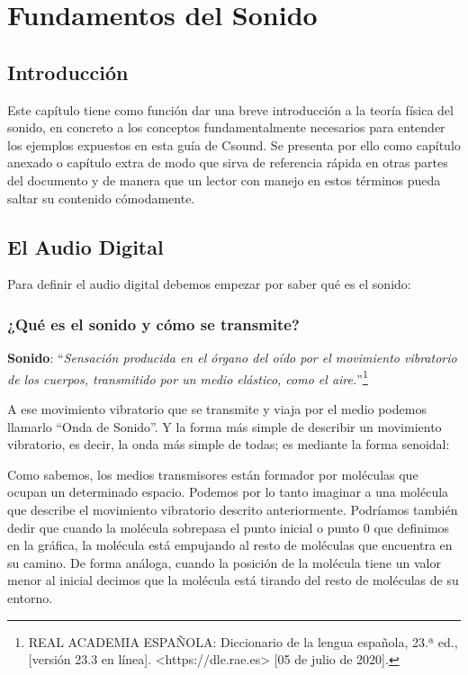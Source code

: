 
\chapter{Fundamentos del Sonido}

\section{Introducción}\label{sec:intro}
Este capítulo tiene como función dar una breve introducción a la teoría física del sonido, en concreto a los conceptos fundamentalmente necesarios para entender los ejemplos expuestos en esta guía de Csound.
Se presenta por ello como capítulo anexado o capítulo extra de modo que sirva de referencia rápida en otras partes del documento y de manera que un lector con manejo en estos términos pueda saltar su contenido cómodamente.


\section{El Audio Digital}\label{sec:DigAud} 
Para definir el audio digital debemos empezar por saber qué es el sonido:\bigskip

\subsection{¿Qué es el sonido y cómo se transmite?}

\textbf{Sonido}: ``\textsl{Sensación producida en el órgano del oído por el movimiento vibratorio de los cuerpos, transmitido por un medio elástico, como el aire.}''\footnote{REAL ACADEMIA ESPAÑOLA: Diccionario de la lengua española, 23.ª ed., [versión 23.3 en línea]. <https://dle.rae.es> [05 de julio de 2020].}\bigskip

A ese movimiento vibratorio que se transmite y viaja por el medio podemos llamarlo ``Onda de Sonido''. Y la forma más simple de describir un movimiento vibratorio, es decir, la onda más simple de todas; es mediante la forma senoidal:


Como sabemos, los medios transmisores están formador por moléculas que ocupan un determinado espacio. Podemos por lo tanto imaginar a una molécula que describe el movimiento vibratorio descrito anteriormente. Podríamos también dedir que cuando la molécula sobrepasa el punto inicial o punto 0 que definimos en la gráfica, la molécula está empujando al resto de moléculas que encuentra en su camino. De forma análoga, cuando la posición de la molécula tiene un valor menor al inicial decimos que la molécula está tirando del resto de moléculas de su entorno.

